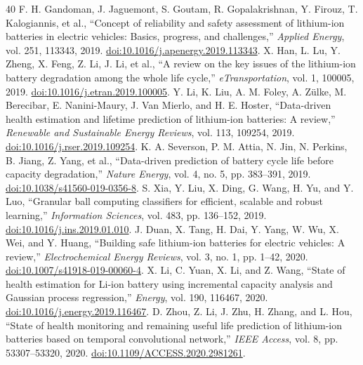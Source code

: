 \begin{thebibliography}{40}
 F. H. Gandoman, J. Jaguemont, S. Goutam, R. Gopalakrishnan, Y. Firouz, T. Kalogiannis, et al., ``Concept of reliability and safety assessment of lithium-ion batteries in electric vehicles: Basics, progress, and challenges,'' \emph{Applied Energy}, vol. 251, 113343, 2019. \href{https://doi.org/10.1016/j.apenergy.2019.113343}{doi:10.1016/j.apenergy.2019.113343}.
 X. Han, L. Lu, Y. Zheng, X. Feng, Z. Li, J. Li, et al., ``A review on the key issues of the lithium-ion battery degradation among the whole life cycle,'' \emph{eTransportation}, vol. 1, 100005, 2019. \href{https://doi.org/10.1016/j.etran.2019.100005}{doi:10.1016/j.etran.2019.100005}.
 Y. Li, K. Liu, A. M. Foley, A. Z\"ulke, M. Berecibar, E. Nanini-Maury, J. Van Mierlo, and H. E. Hoster, ``Data-driven health estimation and lifetime prediction of lithium-ion batteries: A review,'' \emph{Renewable and Sustainable Energy Reviews}, vol. 113, 109254, 2019. \href{https://doi.org/10.1016/j.rser.2019.109254}{doi:10.1016/j.rser.2019.109254}.
 K. A. Severson, P. M. Attia, N. Jin, N. Perkins, B. Jiang, Z. Yang, et al., ``Data-driven prediction of battery cycle life before capacity degradation,'' \emph{Nature Energy}, vol. 4, no. 5, pp. 383--391, 2019. \href{https://doi.org/10.1038/s41560-019-0356-8}{doi:10.1038/s41560-019-0356-8}.
 S. Xia, Y. Liu, X. Ding, G. Wang, H. Yu, and Y. Luo, ``Granular ball computing classifiers for efficient, scalable and robust learning,'' \emph{Information Sciences}, vol. 483, pp. 136--152, 2019. \href{https://doi.org/10.1016/j.ins.2019.01.010}{doi:10.1016/j.ins.2019.01.010}.
 J. Duan, X. Tang, H. Dai, Y. Yang, W. Wu, X. Wei, and Y. Huang, ``Building safe lithium-ion batteries for electric vehicles: A review,'' \emph{Electrochemical Energy Reviews}, vol. 3, no. 1, pp. 1--42, 2020. \href{https://doi.org/10.1007/s41918-019-00060-4}{doi:10.1007/s41918-019-00060-4}.
 X. Li, C. Yuan, X. Li, and Z. Wang, ``State of health estimation for Li-ion battery using incremental capacity analysis and Gaussian process regression,'' \emph{Energy}, vol. 190, 116467, 2020. \href{https://doi.org/10.1016/j.energy.2019.116467}{doi:10.1016/j.energy.2019.116467}.
 D. Zhou, Z. Li, J. Zhu, H. Zhang, and L. Hou, ``State of health monitoring and remaining useful life prediction of lithium-ion batteries based on temporal convolutional network,'' \emph{IEEE Access}, vol. 8, pp. 53307--53320, 2020. \href{https://doi.org/10.1109/ACCESS.2020.2981261}{doi:10.1109/ACCESS.2020.2981261}.

\end{thebibliography}
